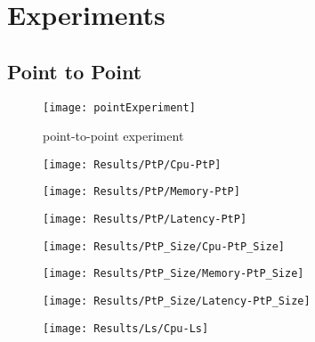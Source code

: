 \section{Experiments} %
\label{sec:experiments}


\subsection{Point to Point} %
\label{sec:point to point}

\begin{figure}[htbp]
    \centering
    \texttt{[image: pointExperiment]}
    \caption{point-to-point experiment}
    \label{fig:gantt}
\end{figure}


\begin{figure}[htbp]
    \centering
    \texttt{[image: Results/PtP/Cpu-PtP]}
    \label{fig:gantt}
\end{figure}

\begin{figure}[htbp]
    \centering
    \texttt{[image: Results/PtP/Memory-PtP]}
    \label{fig:gantt}
\end{figure}

\begin{figure}[htbp]
    \centering
    \texttt{[image: Results/PtP/Latency-PtP]}
    \label{fig:gantt}
\end{figure}

\begin{figure}[htbp]
    \centering
    \texttt{[image: Results/PtP\_Size/Cpu-PtP\_Size]}
    \label{fig:gantt}
\end{figure}

\begin{figure}[htbp]
    \centering
    \texttt{[image: Results/PtP\_Size/Memory-PtP\_Size]}
    \label{fig:gantt}
\end{figure}

\begin{figure}[htbp]
    \centering
    \texttt{[image: Results/PtP\_Size/Latency-PtP\_Size]}
    \label{fig:gantt}
\end{figure}

\begin{figure}[htbp]
    \centering
    \texttt{[image: Results/Ls/Cpu-Ls]}
    \label{fig:gantt}
\end{figure}

